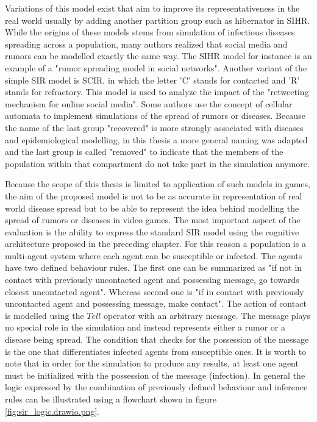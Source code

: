 Variations of this model exist that aim to improve its representativeness in the real world usually by adding another partition group such as hibernator in SIHR\cite{zhao2012sihr}.
While the origins of these models stems from simulation of infectious diseases spreading across a population, many authors realized that social media and rumors can be modelled exactly the same way.
The SIHR model for instance is an example of a "rumor spreading model in social networks"\cite{zhao2012sihr}.
Another variant of the simple SIR model is SCIR, in which the letter 'C' stands for contacted and 'R' stands for refractory.
This model is used to analyze the impact of the "retweeting mechanism for online social media"\cite{xiong2012scir}.
Some authors use the concept of cellular automata to implement simulations of the spread of rumors or diseases\cite{silva2020}.
Because the name of the last group "recovered" is more strongly associated with diseases and epidemiological modelling, in this thesis a more general naming was adapted and the last group is called "removed" to indicate that the members of the population within that compartment do not take part in the simulation anymore.

Because the scope of this thesis is limited to application of such models in games, the aim of the proposed model is not to be as accurate in representation of real world disease spread but to be able to represent the idea behind modelling the spread of rumors or diseases in video games.
The most important aspect of the evaluation is the ability to express the standard SIR model using the cognitive architecture proposed in the preceding chapter.
For this reason a population is a multi-agent system where each agent can be susceptible or infected.
The agents have two defined behaviour rules.
The first one can be summarized as "if not in contact with previously uncontacted agent and possessing message, go towards closest uncontacted agent".
Whereas second one is "if in contact with previously uncontacted agent and possessing message, make contact".
The action of contact is modelled using the $Tell$ operator with an arbitrary message.
The message plays no special role in the simulation and instead represents either a rumor or a disease being spread.
The condition that checks for the possession of the message is the one that differentiates infected agents from susceptible ones.
It is worth to note that in order for the simulation to produce any results, at least one agent must be initialized with the possession of the message (infection).
In general the logic expressed by the combination of previously defined behaviour and inference rules can be illustrated using a flowchart shown in figure \ref{fig:sir_logic.drawio.png}.


